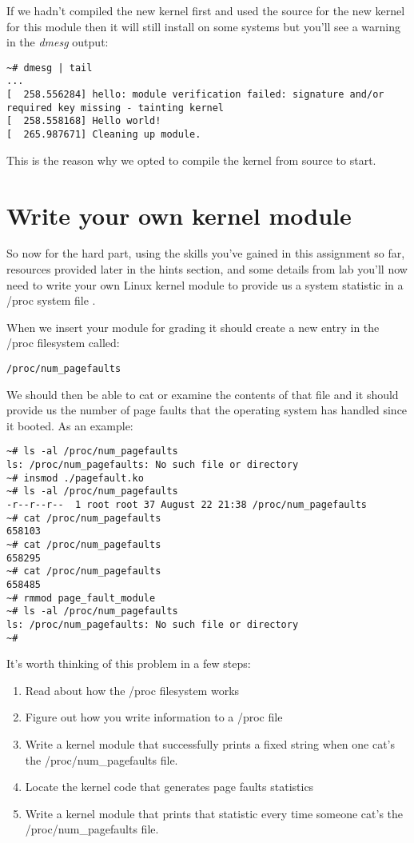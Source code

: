 \documentclass[11pt]{article}
\begin{document}
If we hadn't compiled the new kernel first and used the source for the new kernel for this module then it will still install on some systems but you'll see a warning in the {\it dmesg} output:

\begin{verbatim}
~# dmesg | tail
...
[  258.556284] hello: module verification failed: signature and/or  required key missing - tainting kernel
[  258.558168] Hello world!
[  265.987671] Cleaning up module.
\end{verbatim}

This is the reason why we opted to compile the kernel from source to start. 

\section*{Write your own kernel module}

So now for the hard part, using the skills you've gained in this assignment so far, resources provided later in the hints section, and some details from lab you'll now need to write your own Linux kernel module to provide us a system statistic in a /proc system file \cite{cse551}. 

When we insert your module for grading it should create a new entry in the /proc filesystem called:

\begin{verbatim}
/proc/num_pagefaults
\end{verbatim}

\newpage

We should then be able to cat or examine the contents of that file and it should provide us the number of page faults that the operating system has handled since it booted. As an example:

\begin{verbatim}
~# ls -al /proc/num_pagefaults
ls: /proc/num_pagefaults: No such file or directory
~# insmod ./pagefault.ko 
~# ls -al /proc/num_pagefaults
-r--r--r--  1 root root 37 August 22 21:38 /proc/num_pagefaults
~# cat /proc/num_pagefaults 
658103
~# cat /proc/num_pagefaults 
658295
~# cat /proc/num_pagefaults 
658485
~# rmmod page_fault_module
~# ls -al /proc/num_pagefaults
ls: /proc/num_pagefaults: No such file or directory
~#
\end{verbatim}

It's worth thinking of this problem in a few steps:

\begin{enumerate}
\item Read about how the /proc filesystem works
\item Figure out how you write information to a /proc file
\item Write a kernel module that successfully prints a fixed string when one cat's the /proc/num\_pagefaults file. 
\item Locate the kernel code that generates page faults statistics
\item Write a kernel module that prints that statistic every time someone cat's the /proc/num\_pagefaults file.
\end{enumerate}
\end{document}
